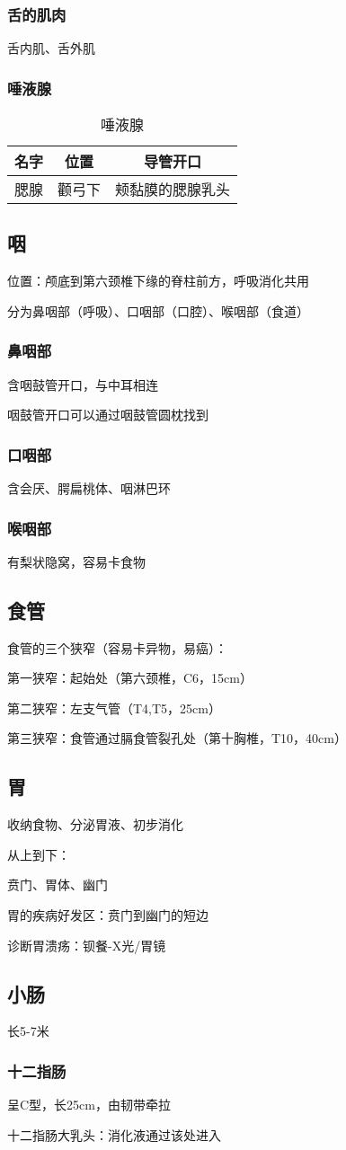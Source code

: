 \subsubsection*{舌的肌肉}%
\label{subsub:舌的肌肉}
舌内肌、舌外肌
\subsubsection{唾液腺}%
\label{subsub:唾液腺}
\begin{table}[htpb]
    \centering
    \caption{唾液腺}
    \label{tab:唾液腺}
    \begin{tabular}{ccc}
    \toprule
    名字 & 位置 & 导管开口\\
    \midrule
    腮腺 & 颧弓下 & 颊黏膜的腮腺乳头\\
    \bottomrule
    \end{tabular}
\end{table}
\subsection{咽}%
\label{sub:咽}
位置：颅底到第六颈椎下缘的脊柱前方，呼吸消化共用

分为鼻咽部（呼吸）、口咽部（口腔）、喉咽部（食道）
\subsubsection*{鼻咽部}%
\label{subsub:鼻咽部}
含咽鼓管开口，与中耳相连

咽鼓管开口可以通过咽鼓管圆枕找到
\subsubsection*{口咽部}%
\label{subsub:口咽部}
含会厌、腭扁桃体、咽淋巴环
\subsubsection*{喉咽部}%
\label{subsub:喉咽部}
有梨状隐窝，容易卡食物
\subsection{食管}%
\label{sub:食管}
食管的三个狭窄（容易卡异物，易癌）：

第一狭窄：起始处（第六颈椎，C6，15cm）

第二狭窄：左支气管（T4,T5，25cm）

第三狭窄：食管通过膈食管裂孔处（第十胸椎，T10，40cm）
\subsection{胃}%
\label{sub:胃}
收纳食物、分泌胃液、初步消化
\begin{notation}
    从上到下：

    贲门、胃体、幽门

    胃的疾病好发区：贲门到幽门的短边

    诊断胃溃疡：钡餐-X光/胃镜
\end{notation}
\subsection{小肠}%
\label{sub:小肠}
长5-7米
\subsubsection*{十二指肠}%
\label{subsub:十二指肠}
呈C型，长25cm，由韧带牵拉
\begin{notation}
    十二指肠大乳头：消化液通过该处进入
\end{notation}

